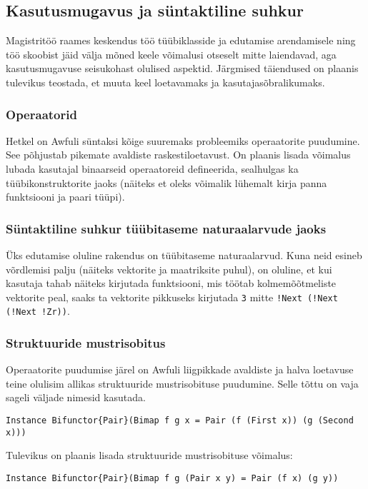 \documentclass[12pt]{article}
\begin{document}
    \subsection{Kasutusmugavus ja süntaktiline suhkur}
      Magistritöö raames keskendus töö tüübiklasside ja edutamise arendamisele ning töö skoobist jäid välja mõned keele võimalusi otseselt mitte laiendavad, aga kasutusmugavuse seisukohast olulised aspektid. Järgmised täiendused on plaanis tulevikus teostada, et muuta keel loetavamaks ja kasutajasõbralikumaks.
      \subsubsection{Operaatorid}
        Hetkel on Awfuli süntaksi kõige suuremaks probleemiks operaatorite puudumine. See põhjustab pikemate avaldiste raskestiloetavust. On plaanis lisada võimalus lubada kasutajal binaarseid operaatoreid defineerida, sealhulgas ka tüübikonstruktorite jaoks (näiteks et oleks võimalik lühemalt kirja panna funktsiooni ja paari tüüpi).
      \subsubsection{Süntaktiline suhkur tüübitaseme naturaalarvude jaoks}
        Üks edutamise oluline rakendus on tüübitaseme naturaalarvud. Kuna neid esineb võrdlemisi palju (näiteks vektorite ja maatriksite puhul), on oluline, et kui kasutaja tahab näiteks kirjutada funktsiooni, mis töötab kolmemõõtmeliste vektorite peal, saaks ta vektorite pikkuseks kirjutada \verb!3! mitte \verb"!Next (!Next (!Next !Zr))".
      \subsubsection{Struktuuride mustrisobitus}
        Operaatorite puudumise järel on Awfuli liigpikkade avaldiste ja halva loetavuse teine olulisim allikas struktuuride mustrisobituse puudumine. Selle tõttu on vaja sageli väljade nimesid kasutada.

        \begin{verbatim}Instance Bifunctor{Pair}(Bimap f g x = Pair (f (First x)) (g (Second x)))\end{verbatim}

        Tulevikus on plaanis lisada struktuuride mustrisobituse võimalus:

        \begin{verbatim}Instance Bifunctor{Pair}(Bimap f g (Pair x y) = Pair (f x) (g y))\end{verbatim}
\end{document}
